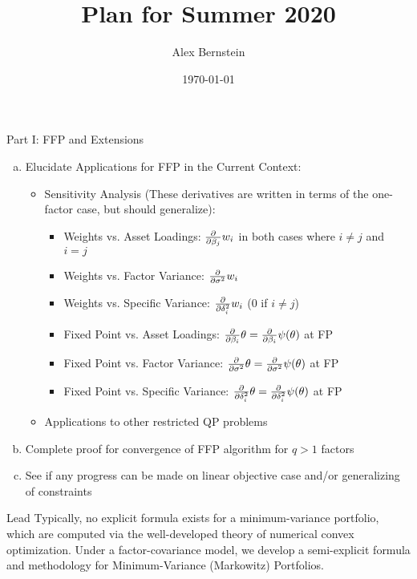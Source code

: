 \documentclass[11pt,leqno]{beamer}
\title{Plan for Summer 2020}
\date{\today}
\author{\texorpdfstring{Alex Bernstein\\}
\texorpdfstring{\url{abernstein@ucsb.edu}\\}
{\it (joint work with Alex Shkolnik)}}
\institute{
{\it Department of Statistics \& Applied Probability\\ }
University of California, Santa Barbara
}
\begin{document}
\ifxetex
  \let\lsum\sum
  \renewcommand{\sum}{\bm{\lsum}}

  \let\lprod\prod
  \renewcommand{\prod}{\bm{\lprod}}
\else
\fi




\begin{frame}
\maketitle
\end{frame}

\newcommand{\af}{Y}
\newcommand{\df}{X}

\begin{frame}{Part I: FFP and Extensions}
\begin{enumerate}[a)]
\item Elucidate Applications for FFP in the Current Context:
\begin{itemize}
\item Sensitivity Analysis (These derivatives are written in terms of the one-factor case, but should generalize):

\begin{itemize}
\item Weights vs. Asset Loadings: $\frac{\partial }{ \partial {\beta_j}} w_i$ in both cases where $i \neq j$ and $i=j$
\item Weights vs. Factor Variance: $\frac{\partial }{ \partial {\sigma^2}} w_i$ 
\item Weights vs. Specific Variance: $\frac{\partial }{ \partial {\delta_i^2}} w_i$ (0 if $i \neq j$)
\item Fixed Point vs. Asset Loadings: $\frac{\partial }{ \partial {\beta_i}}\theta= \frac{\partial }{ \partial {\beta_i}}{\psi(\theta)}$ at FP
\item Fixed Point vs. Factor Variance: $\frac{\partial }{ \partial {\sigma^2}}\theta= \frac{\partial }{ \partial {\sigma^2}}{\psi(\theta)}$ at FP
\item Fixed Point vs. Specific Variance: $\frac{\partial }{ \partial {\delta_i^2}}\theta= \frac{\partial }{ \partial {\delta_i^2}}{\psi(\theta)}$ at FP
\end{itemize}
\item Applications to other restricted QP problems
\end{itemize}
\item Complete proof for convergence of FFP algorithm for $q>1$ factors
\item See if any progress can be made on linear objective case and/or generalizing of constraints
\end{enumerate}
\end{frame}


\begin{frame}{Lead}
Typically, no explicit formula exists for a minimum-variance portfolio, which are computed via the well-developed theory of numerical convex optimization. Under a factor-covariance model, we develop a semi-explicit formula and methodology for Minimum-Variance (Markowitz) Portfolios.
\end{frame}
\end{document}
